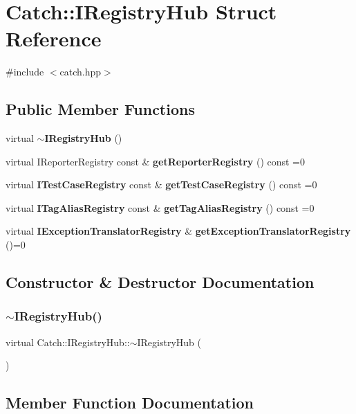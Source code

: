 \section{Catch\+:\+:I\+Registry\+Hub Struct Reference}
\label{struct_catch_1_1_i_registry_hub}


{\ttfamily \#include $<$catch.\+hpp$>$}

\subsection*{Public Member Functions}
\begin{DoxyCompactItemize}
\item 
virtual \textbf{ $\sim$\+I\+Registry\+Hub} ()
\item 
virtual I\+Reporter\+Registry const  \& \textbf{ get\+Reporter\+Registry} () const =0
\item 
virtual \textbf{ I\+Test\+Case\+Registry} const  \& \textbf{ get\+Test\+Case\+Registry} () const =0
\item 
virtual \textbf{ I\+Tag\+Alias\+Registry} const  \& \textbf{ get\+Tag\+Alias\+Registry} () const =0
\item 
virtual \textbf{ I\+Exception\+Translator\+Registry} \& \textbf{ get\+Exception\+Translator\+Registry} ()=0
\end{DoxyCompactItemize}


\subsection{Constructor \& Destructor Documentation}
\mbox{\label{struct_catch_1_1_i_registry_hub_a050de0f27f96888c8b410992146c9a09}} 
\subsubsection{$\sim$\+I\+Registry\+Hub()}
{\footnotesize\ttfamily virtual Catch\+::\+I\+Registry\+Hub\+::$\sim$\+I\+Registry\+Hub (\begin{DoxyParamCaption}{ }\end{DoxyParamCaption})\hspace{0.3cm}{\ttfamily [virtual]}}



\subsection{Member Function Documentation}
\mbox{\label{struct_catch_1_1_i_registry_hub_a3606988da110c016c5af3ae63454eb78}} 

